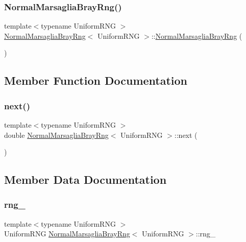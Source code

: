 \subsubsection{\texorpdfstring{Normal\+Marsaglia\+Bray\+Rng()}{NormalMarsagliaBrayRng()}}
{\footnotesize\ttfamily template$<$typename Uniform\+R\+NG $>$ \\
\hyperlink{class_normal_marsaglia_bray_rng}{Normal\+Marsaglia\+Bray\+Rng}$<$ Uniform\+R\+NG $>$\+::\hyperlink{class_normal_marsaglia_bray_rng}{Normal\+Marsaglia\+Bray\+Rng} (\begin{DoxyParamCaption}{ }\end{DoxyParamCaption})\hspace{0.3cm}{\ttfamily [inline]}}



\subsection{Member Function Documentation}
\hypertarget{class_normal_marsaglia_bray_rng_a2cc54f5f331a5bd71eedc67c84db7279}{}\label{class_normal_marsaglia_bray_rng_a2cc54f5f331a5bd71eedc67c84db7279} 
\subsubsection{\texorpdfstring{next()}{next()}}
{\footnotesize\ttfamily template$<$typename Uniform\+R\+NG $>$ \\
double \hyperlink{class_normal_marsaglia_bray_rng}{Normal\+Marsaglia\+Bray\+Rng}$<$ Uniform\+R\+NG $>$\+::next (\begin{DoxyParamCaption}{ }\end{DoxyParamCaption})}



\subsection{Member Data Documentation}
\hypertarget{class_normal_marsaglia_bray_rng_a590b5bfbb3888d5163c6e3d702bfb2e0}{}\label{class_normal_marsaglia_bray_rng_a590b5bfbb3888d5163c6e3d702bfb2e0} 
\subsubsection{\texorpdfstring{rng\+\_\+}{rng\_}}
{\footnotesize\ttfamily template$<$typename Uniform\+R\+NG $>$ \\
Uniform\+R\+NG \hyperlink{class_normal_marsaglia_bray_rng}{Normal\+Marsaglia\+Bray\+Rng}$<$ Uniform\+R\+NG $>$\+::rng\+\_\+\hspace{0.3cm}{\ttfamily [private]}}

